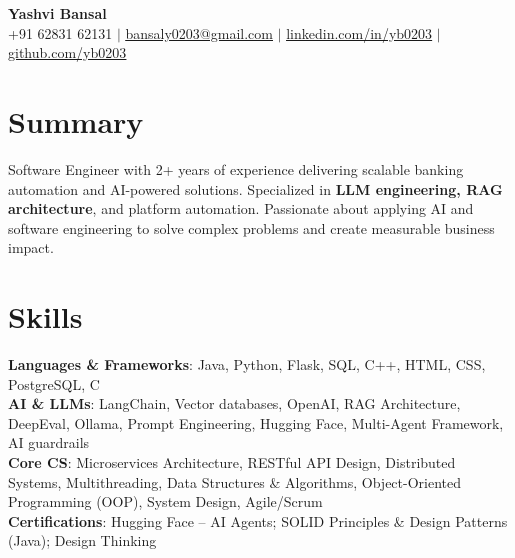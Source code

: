 \documentclass[a4paper,10pt]{article}
\begin{document}
\begin{center}
    {\Huge \textbf{Yashvi Bansal}} \\ \vspace{4pt}
    \small 
    +91 62831 62131 $|$
    \href{mailto:bansaly0203@gmail.com}{\underline{bansaly0203@gmail.com}} $|$ 
    \href{https://linkedin.com/in/yb0203}{\underline{linkedin.com/in/yb0203}} $|$ 
    \href{https://github.com/yb0203}{\underline{github.com/yb0203}}
\end{center}

\section{Summary}
\vspace{2pt}
\small{Software Engineer with 2+ years of experience delivering scalable banking automation and AI-powered solutions. Specialized in \textbf{LLM engineering, RAG architecture}, and platform automation. Passionate about applying AI and software engineering to solve complex problems and create measurable business impact.}

\section{Skills}
\vspace{2pt}
 \begin{itemize}[leftmargin=0.15in, label={}]
    \small{\item{
     \textbf{Languages \& Frameworks}{: Java, Python, Flask, SQL, C++, HTML, CSS, PostgreSQL, C} \\
     \textbf{AI \& LLMs}{: LangChain, Vector databases, OpenAI, RAG Architecture, DeepEval, Ollama, Prompt Engineering, Hugging Face, Multi-Agent Framework, AI guardrails} \\
     \textbf{Core CS}{: Microservices Architecture, RESTful API Design, Distributed Systems, Multithreading, Data Structures \& Algorithms, Object-Oriented Programming (OOP), System Design, Agile/Scrum} \\
     \textbf{Certifications}{: Hugging Face -- AI Agents; SOLID Principles \& Design Patterns (Java); Design Thinking}
    }}
 \end{itemize}

\end{document}
